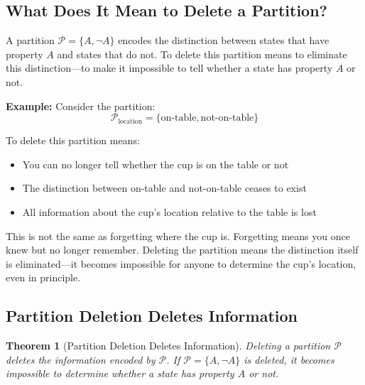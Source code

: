 \documentclass[twocolumn,10pt]{article}
\newtheorem{theorem}{Theorem}[section]
\theoremstyle{definition}
\theoremstyle{remark}
\begin{document}
\subsection{What Does It Mean to Delete a Partition?}

A partition $\mathcal{P} = \{A, \neg A\}$ encodes the distinction between states that have property $A$ and states that do not. To delete this partition means to eliminate this distinction—to make it impossible to tell whether a state has property $A$ or not.

\vspace{0.2cm}
\noindent\textbf{Example:} Consider the partition:
\begin{equation}
\mathcal{P}_{\text{location}} = \{\text{on-table}, \text{not-on-table}\}
\end{equation}

To delete this partition means:
\begin{itemize}
\item You can no longer tell whether the cup is on the table or not
\item The distinction between on-table and not-on-table ceases to exist
\item All information about the cup's location relative to the table is lost
\end{itemize}

\noindent This is not the same as forgetting where the cup is. Forgetting means you once knew but no longer remember. Deleting the partition means the distinction itself is eliminated—it becomes impossible for anyone to determine the cup's location, even in principle.

\subsection{Partition Deletion Deletes Information}

\begin{theorem}[Partition Deletion Deletes Information]
\label{thm:partition_deletion}
Deleting a partition $\mathcal{P}$ deletes the information encoded by $\mathcal{P}$. If $\mathcal{P} = \{A, \neg A\}$ is deleted, it becomes impossible to determine whether a state has property $A$ or not.
\end{theorem}
\end{document}
